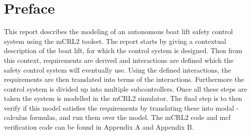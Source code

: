 \section{Preface}
This report describes the modeling of an autonomous boat lift safety control system using the mCRL2 toolset. The report starts by giving a contextual description of the boat lift, for which the control system is designed. Then from this context, requirements are derived and interactions are defined which the safety control system will eventually use. Using the defined interactions, the requirements are then translated into terms of the interactions. Furthermore the control system is divided up into multiple subcontrollers. Once all these steps are taken the system is modelled in the mCRL2 simulator. The final step is to then verify if this model satisfies the requirements by translating these into modal {\textmu}-calculus formulas, and run them over the model. The mCRL2 code and mcf verification code can be found in Appendix A and Appendix B.



